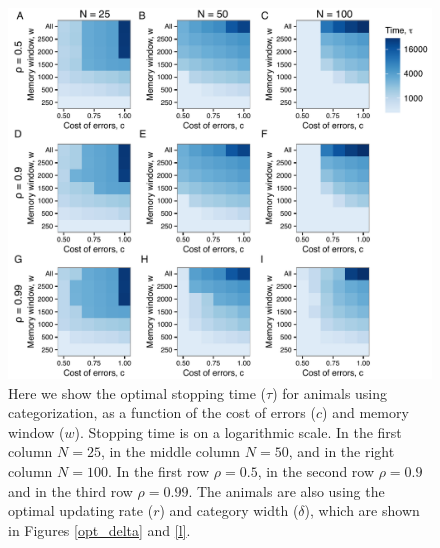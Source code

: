 \begin{figure}
\includegraphics[width=6.85in]{figures/time_heat_maps.pdf}
\caption{\sffamily\small\textbf{} Here we show the optimal stopping time ($\tau$) for animals using categorization, as a function of the cost of errors ($c$) and memory window ($w$). Stopping time is on a logarithmic scale. In the first column $N=25$, in the middle column $N=50$, and in the right column $N=100$. In the first row $\rho=0.5$, in the second row $\rho=0.9$ and in the third row $\rho=0.99$. The animals are also using the optimal updating rate ($r$) and category width ($\delta$), which are shown in Figures \ref{opt_delta} and \ref{l}.}
\label{time}
\end{figure}


